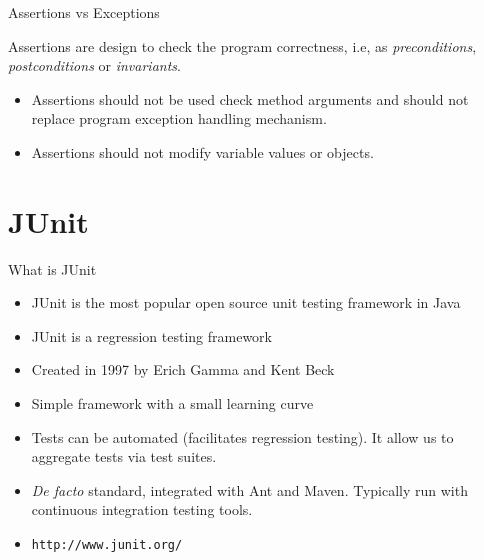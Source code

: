 \documentclass[11pt, xcolor=svgnames]{beamer}
\begin{document}

\begin{frame}[fragile]{Assertions vs Exceptions}

Assertions are design to check the program correctness, i.e, as \emph{preconditions}, \emph{postconditions} or \emph{invariants}.

\begin{itemize}
 \item Assertions should not be used check method arguments and should not replace program exception handling mechanism.
 \item Assertions should not modify variable values or objects.
\end{itemize}


\end{frame}



\section{JUnit}


\begin{frame}{What is JUnit}

  \begin{itemize}
     \item JUnit is the most popular open source unit testing framework in Java
     \item JUnit is a regression testing framework
     \item Created in 1997 by Erich Gamma and Kent Beck
     \item Simple framework with a small learning curve
     \item Tests can be automated (facilitates regression testing). It allow us to aggregate tests via test suites.
     \item \textit{De facto} standard, integrated with Ant and Maven. Typically run with continuous integration testing tools. 
     \item \texttt{http://www.junit.org/}
  \end{itemize}
\end{frame}

\end{document}
